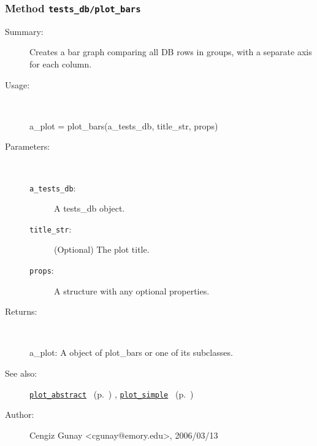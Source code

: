 \subsubsection[Method \texttt{plot\_bars}]{Method \texttt{tests\_db/plot\_bars}}%
%
\label{ref_tests_db__plot_bars}%
\hypertarget{ref_tests_db__plot_bars}{}%
\begin{description}
\item[Summary:]Creates a bar graph comparing all DB rows in groups, with a separate axis for each column.
%
\item[Usage:]~%
\begin{lyxcode}%
a\_plot = plot\_bars(a\_tests\_db, title\_str, props)
%
\end{lyxcode}%
%
%
\item[Parameters:]~
\begin{description}%
\item[\texttt{a\_tests\_db}:]
 A tests\_db object.
\item[\texttt{title\_str}:]
 (Optional) The plot title.
\item[\texttt{props}:]
 A structure with any optional properties.
\end{description}%
%
\item[Returns:
]~

	a\_plot: A object of plot\_bars or one of its subclasses.
%
%
\item[See also:]%
\hyperlink{ref_plot_abstract}{\texttt{plot\_abstract}}%
\ (p.~\pageref{ref_plot_abstract})%
%
, \hyperlink{ref_plot_simple}{\texttt{plot\_simple}}%
\ (p.~\pageref{ref_plot_simple})%
%
%
\item[Author:]%
Cengiz Gunay <cgunay@emory.edu>, 2006/03/13
%
\end{description}
\methodline%

